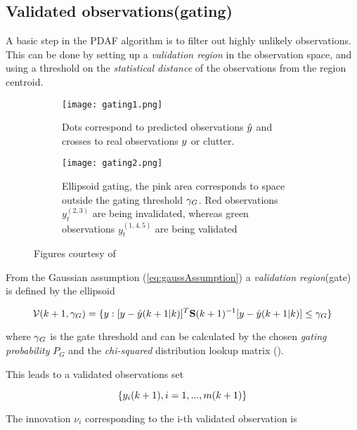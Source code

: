 \subsection{Validated observations(gating)}

A basic step in the PDAF algorithm is to filter out highly unlikely observations. This can be done by setting up a \emph{validation region} in the observation space, and using a threshold on the \emph{statistical distance} of the observations from the region centroid.


\begin{figure}[H]
	\begin{subfigure}{.5\textwidth}
		\centering
		\texttt{[image: gating1.png]}
		\caption{Dots correspond to predicted observations ${\hat{{y}}}$ and  crosses to real observations ${y}$ or clutter.}
		\label{fig:gating1}
	\end{subfigure}
	\begin{subfigure}{.5\textwidth}
			\centering
			\texttt{[image: gating2.png]}
			\caption{Ellipsoid gating, the pink area corresponds to space outside the gating threshold ${\gamma_G}$. Red observations $y_t^{(2,3)}$ are being invalidated, whereas green observations $y_t^{(1,4,5)}$ are being validated}
			\label{fig:gating2}
	\end{subfigure}
	\caption{Figures courtesy of \cite{TargetTracking}}
	\label{fig:fig}
\end{figure}




From the Gaussian assumption (\eqref{eq:gaussAssumption}) a \emph{validation region}(gate) is defined by the ellipsoid

\begin{equation}\label{eq:validationGate}
\mathcal{V}(k+1, {\gamma_G}) = \{{y}: [{y}-{\hat{{y}}}(k+1|k)]^T \mathbf{S}(k+1)^{-1} [{y}-{\hat{{y}}}(k+1|k)] \leq {\gamma_G} \}
\end{equation}



where ${\gamma_G}$ is the gate threshold and can be calculated by the chosen \emph{gating probability }$P_G$ and the \emph{chi-squared} distribution lookup matrix ().


This leads to a validated observations set

$$
\{{y}_i(k+1), i = 1, ..., m(k+1)\}
$$


The innovation $\nu_i$ corresponding to the i-th validated observation is

